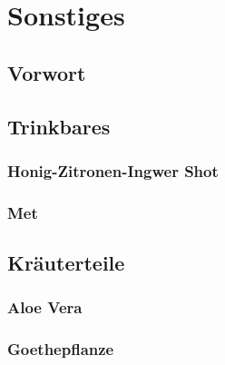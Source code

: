 \chapter{Sonstiges}


\section{Vorwort}



\section{Trinkbares}


\subsection{Honig-Zitronen-Ingwer Shot}


\subsection{Met}



\section{Kräuterteile}


\subsection{Aloe Vera}


\subsection{Goethepflanze}